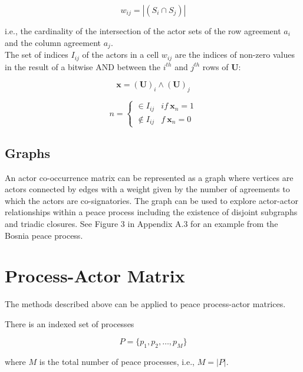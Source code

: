 \documentclass{article}
\begin{document}
\begin{equation}
w_{ij} =  |(S_{i} \cap S_{j}) | 
\end{equation}

i.e., the cardinality of the intersection of the actor sets of the row agreement $a_i$ and the column agreement $a_j$. \\

The set of indices $I_{ij}$ of the actors in a cell $w_{ij}$ are the indices of non-zero values in the result of a bitwise AND between the $i^{th}$ and $j^{th}$ rows of $\bm{U}$:

\begin{equation}
\bm{x} = \bm{(U)}_i \land \bm{(U)} _j
\end{equation}

\begin{equation}
n =
\begin{cases}
\in I_{ij} & if \  \bm{x}_n = 1\\
\notin I_{ij} & f \  \bm{x}_n = 0
\end{cases}
\end{equation}

\subsection{Graphs}

An actor co-occurrence matrix can be represented as a graph where vertices are actors connected by edges with a weight given by the number of agreements to which the actors are co-signatories.  The graph can be used to explore actor-actor relationships within a peace process including the existence of disjoint subgraphs and triadic closures. See Figure 3 in Appendix A.3 for an example from the Bosnia peace process. \newline


\section{Process-Actor Matrix}

The methods described above can be applied to peace process-actor matrices.\newline

There is an indexed set of processes 

\begin{equation}
P=\{p_1,p_2,…,p_M\}
\end{equation}

where $M$ is the total number of peace processes, i.e., $M=|P|$.\newline
\end{document}
